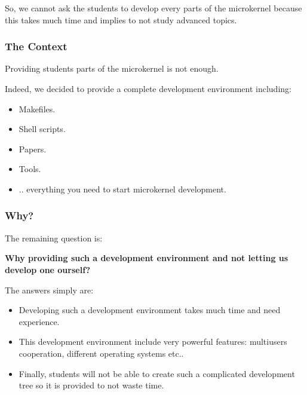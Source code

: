 {\begin{frame}
  \nl

  So, we cannot ask the students to develop every parts of the microkernel
  because this takes much time and implies to not study advanced
  topics.
\end{frame}


\begin{frame}
  \frametitle{The Context}

  Providing students parts of the microkernel is not enough.

  \nl

  Indeed, we decided to provide a complete development environment
  including:

  \begin{itemize}
    \item
      Makefiles.
    \item
      Shell scripts.
    \item
      Papers.
    \item
      Tools.
    \item
      .. everything you need to start microkernel development.
  \end{itemize}
\end{frame}


\begin{frame}
  \frametitle{Why?}

  The remaining question is:

  \nl

  \textbf{Why providing such a development environment and not letting us
    develop one ourself?}

  \nl

  The answers simply are:

  \begin{itemize}
    \item
      Developing such a development environment takes much time and
      need experience.
    \item
      This development environment include very powerful features:
      multiusers cooperation, different operating systems etc..
    \item
      Finally, students will not be able to create such a complicated
      development tree so it is provided to not waste time.
  \end{itemize}
\end{frame}


}
